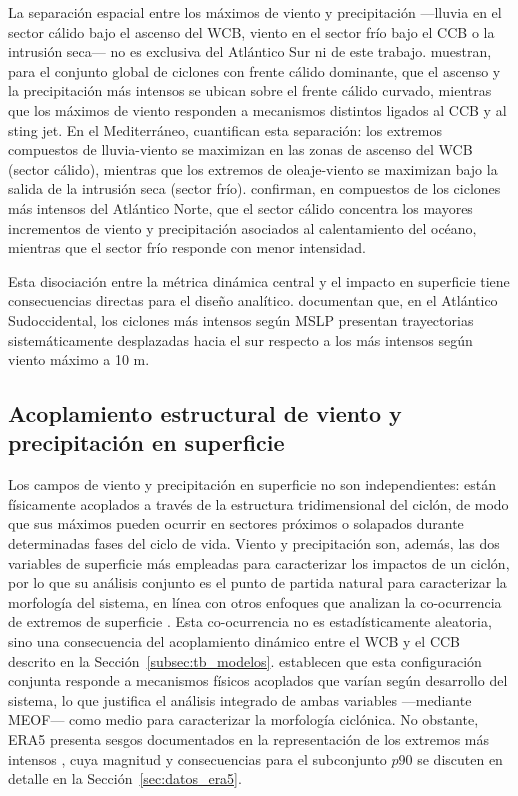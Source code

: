 La separación espacial entre los máximos de viento y precipitación —lluvia en el sector cálido bajo el ascenso del WCB, viento en el sector frío bajo el CCB o la intrusión seca— no es exclusiva del Atlántico Sur ni de este trabajo.
\citet{sinclair2023relationship} muestran, para el conjunto global de ciclones con frente cálido dominante, que el ascenso y la precipitación más intensos se ubican sobre el frente cálido curvado, mientras que los máximos de viento responden a mecanismos distintos ligados al CCB y al sting jet.
En el Mediterráneo, \citet{portal2024linking} cuantifican esta separación: los extremos compuestos de lluvia-viento se maximizan en las zonas de ascenso del WCB (sector cálido), mientras que los extremos de oleaje-viento se maximizan bajo la salida de la intrusión seca (sector frío).
\citet{gentile2025response} confirman, en compuestos de los ciclones más intensos del Atlántico Norte, que el sector cálido concentra los mayores incrementos de viento y precipitación asociados al calentamiento del océano, mientras que el sector frío responde con menor intensidad.

Esta disociación entre la métrica dinámica central y el impacto en superficie tiene consecuencias directas para el diseño analítico.
\citet{andrade2024composite} documentan que, en el Atlántico Sudoccidental, los ciclones más intensos según MSLP presentan trayectorias sistemáticamente desplazadas hacia el sur respecto a los más intensos según viento máximo a 10 m.

\subsection{Acoplamiento estructural de viento y precipitación en superficie}\label{subsec:tb_compound_def}
Los campos de viento y precipitación en superficie no son independientes: están físicamente acoplados a través de la estructura tridimensional del ciclón, de modo que sus máximos pueden ocurrir en sectores próximos o solapados durante determinadas fases del ciclo de vida.
Viento y precipitación son, además, las dos variables de superficie más empleadas para caracterizar los impactos de un ciclón, por lo que su análisis conjunto es el punto de partida natural para caracterizar la morfología del sistema, en línea con otros enfoques que analizan la co-ocurrencia de extremos de superficie \citep{zscheischler2018future}.
Esta co-ocurrencia no es estadísticamente aleatoria, sino una consecuencia del acoplamiento dinámico entre el WCB y el CCB descrito en la Sección~\ref{subsec:tb_modelos}.
\citet{chen2025characteristics} establecen que esta configuración conjunta responde a mecanismos físicos acoplados que varían según desarrollo del sistema, lo que justifica el análisis integrado de ambas variables —mediante MEOF— como medio para caracterizar la morfología ciclónica.
No obstante, ERA5 presenta sesgos documentados en la representación de los extremos más intensos \citep{chen2024evaluation}, cuya magnitud y consecuencias para el subconjunto $p90$ se discuten en detalle en la Sección~\ref{sec:datos_era5}.


